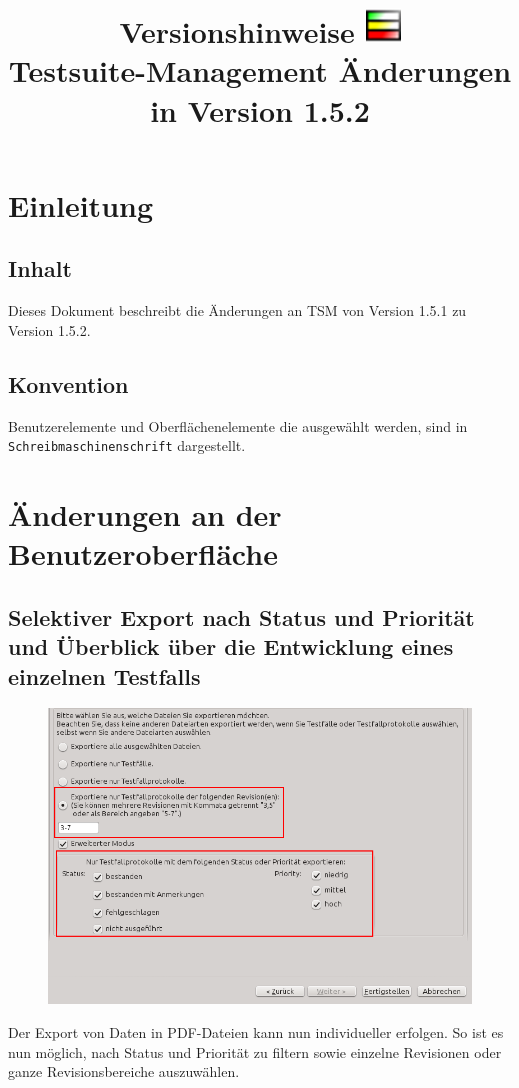 \documentclass[11pt,a4paper,titlepage]{article}
\title{{\Huge Versionshinweise} \linebreak \linebreak
\includegraphics[width= 35px]{BilderHandbuch/icon32.png} \\
\textbf{Testsuite-Management}
\linebreak \linebreak Änderungen in Version 1.5.2}
\begin{document}
\maketitle
\pagebreak

\tableofcontents
\pagebreak

\section{Einleitung}
\subsection{Inhalt}
Dieses Dokument beschreibt die Änderungen an TSM von Version 1.5.1 zu Version 1.5.2.

\subsection{Konvention}
Benutzerelemente und Oberflächenelemente die ausgewählt werden, sind in \texttt{Schreibmaschinenschrift} dargestellt.

\section{Änderungen an der Benutzeroberfläche}
\subsection{Selektiver Export nach Status und Priorität und Überblick über die Entwicklung eines einzelnen Testfalls}
 \begin{figure}[H]
 \centering
 \includegraphics[width=\textwidth]{./BilderAenderungen/pdf-export.png}
\end{figure}
Der Export von Daten in PDF-Dateien kann nun individueller erfolgen.
So ist es nun möglich, nach Status und Priorität zu filtern sowie einzelne Revisionen oder ganze Revisionsbereiche auszuwählen.
\end{document}
